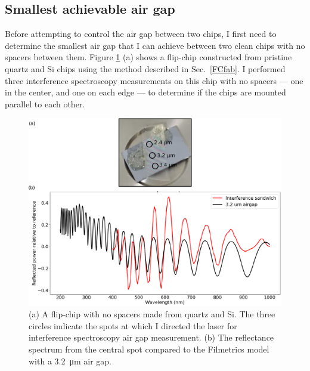 \documentclass{beavtex_dub_edit}
\begin{document}
\subsection{Smallest achievable air gap} \label{smallest achievable air gap}
Before attempting to control the air gap between two chips, I first need to determine the smallest air gap that I can achieve between two clean chips with no spacers between them. Figure \ref{interference sandwich} (a) shows a flip-chip constructed from pristine quartz and Si chips using the method described in Sec.\ \ref{FCfab}. I performed three interference spectroscopy measurements on this chip with no spacers — one in the center, and one on each edge — to determine if the chips are mounted parallel to each other.


\begin{figure}
    \includegraphics[width=1\textwidth]{interference sandwich image and spectrum.pdf}
    \caption{(a) A flip-chip with no spacers made from quartz and Si. The three circles indicate the spots at which I directed the laser for interference spectroscopy air gap measurement. (b) The reflectance spectrum from the central spot compared to the Filmetrics model with a \SI{3.2}{\micro\meter} air gap.}
    \label{interference sandwich}
\end{figure}
\end{document}
